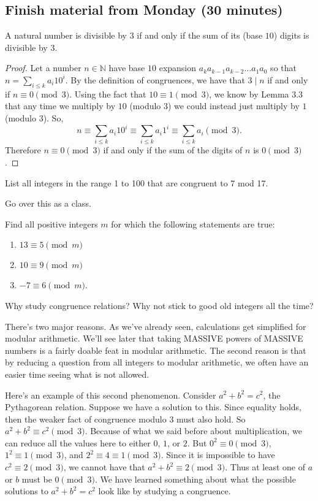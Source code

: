 \documentclass[letterpaper, 11 pt]{article}
\begin{document}
\subsection{Finish material from Monday (30 minutes)}
\begin{prop} A natural number is divisible by $3$ if and only if the sum of its (base $10$) digits is divisible by $3$.
\end{prop}
\begin{proof} Let a  number $n\in \mathbb{N}$ have base $10$ expansion $a_ka_{k-1}a_{k-2}\dots a_1a_0$ so that $n=\sum_{i\le k} a_i 10^i$.  By the definition of congruences, we have that $3\mid n$ if and only if $n\equiv 0 \pmod{3}$. Using the fact that $10\equiv 1 \pmod{3}$, we know by Lemma 3.3 that any time we multiply by $10$ (modulo $3$) we could instead just multiply by $1$ (modulo $3$). So,
\[
n \equiv \sum_{i\le k} a_i 10^i \equiv \sum_{i\le k} a_i 1^i \equiv \sum_{i\le k} a_i \pmod{3}.
\]
Therefore $n\equiv 0\pmod{3}$ if and only if the sum of the digits of $n$ is $0\pmod{3}$. 
\end{proof}

\begin{br}[5 minutes]
 List all integers in the range 1 to 100 that are congruent to 7 mod 17. 
\end{br}

Go over this as a class. 


\begin{br}
 Find all positive integers $m$ for which the following statements are true:
\begin{enumerate}
 \item $13\equiv 5 \pmod m$
 \item $10\equiv 9 \pmod m$
 \item $-7\equiv 6 \pmod m$.
\end{enumerate}
\end{br}

Why study congruence relations? Why not stick to good old integers all the time? 

There's two major reasons. As we've already seen, calculations get simplified for modular arithmetic. We'll see later that taking MASSIVE powers of MASSIVE numbers is a fairly doable feat in modular arithmetic. The second reason is that by reducing a question from all integers to modular arithmetic, we often have an easier time seeing what is not allowed. 

Here's an example of this second phenomenon. Consider $a^2+b^2=c^2$, the Pythagorean relation. Suppose we have a solution to this. Since equality holds, then the weaker fact of congruence modulo 3 must also hold. So $a^2+b^2\equiv c^2\pmod{3}$. Because of what we said before about multiplication, we can reduce all the values here to either $0$, $1$, or $2$. But $0^2\equiv 0 \pmod{3}$, $1^2\equiv 1 \pmod{3}$, and $2^2\equiv 4 \equiv 1 \pmod{3}$.  Since it is impossible to have $c^2\equiv 2 \pmod{3}$, we cannot have that $a^2+b^2\equiv 2 \pmod{3}$. Thus at least one of $a$ or $b$ must be $0\pmod{3}$. We have learned something about what the possible solutions to $a^2+b^2=c^2$ look like by studying a congruence.
\end{document}

